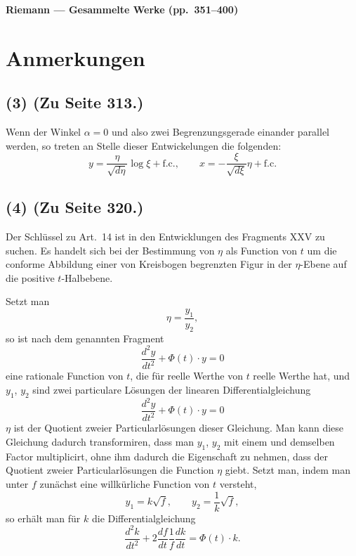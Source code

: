 \documentclass[12pt,a4paper]{article}
\begin{document}
\begin{center}
{\LARGE\bfseries Riemann --- Gesammelte Werke (pp.~351--400)}\\[1em]
\end{center}

\tableofcontents
\newpage

\section*{Anmerkungen}

\subsection*{(3) (Zu Seite 313.)}

Wenn der Winkel $\alpha = 0$ und also zwei Begrenzungsgerade einander parallel werden, so treten an Stelle dieser Entwickelungen die folgenden:
\[
y = \frac{\eta}{\sqrt{d\eta}} \log \xi + \text{f.c.}, \qquad
x = -\frac{\xi}{\sqrt{d\xi}} \eta + \text{f.c.}
\]

\subsection*{(4) (Zu Seite 320.)}

Der Schl\"ussel zu Art.~14 ist in den Entwicklungen des Fragments XXV zu suchen. Es handelt sich bei der Bestimmung von $\eta$ als Function von $t$ um die conforme Abbildung einer von Kreisbogen begrenzten Figur in der $\eta$-Ebene auf die positive $t$-Halbebene.

Setzt man
\[
\eta = \frac{y_1}{y_2},
\]
so ist nach dem genannten Fragment
\[
\frac{d^2y}{dt^2} + \Phi(t) \cdot y = 0
\]
eine rationale Function von $t$, die f\"ur reelle Werthe von $t$ reelle Werthe hat, und $y_1$, $y_2$ sind zwei particulare L\"osungen der linearen Differentialgleichung
\begin{equation}\label{eq:diffeq2}
\frac{d^2y}{dt^2} + \Phi(t) \cdot y = 0
\end{equation}
$\eta$ ist der Quotient zweier Particularl\"osungen dieser Gleichung. Man kann diese Gleichung dadurch transformiren, dass man $y_1$, $y_2$ mit einem und demselben Factor multiplicirt, ohne ihm dadurch die Eigenschaft zu nehmen, dass der Quotient zweier Particularl\"osungen die Function $\eta$ giebt. Setzt man, indem man unter $f$ zun\"achst eine willk\"urliche Function von $t$ versteht,
\[
y_1 = k\sqrt{f}, \qquad y_2 = \frac{1}{k}\sqrt{f},
\]
so erh\"alt man f\"ur $k$ die Differentialgleichung
\begin{equation}\label{eq:diffeq4}
\frac{d^2k}{dt^2} + 2\frac{df}{dt}\frac{1}{f}\frac{dk}{dt} = \Phi(t) \cdot k.
\end{equation}
\end{document}
